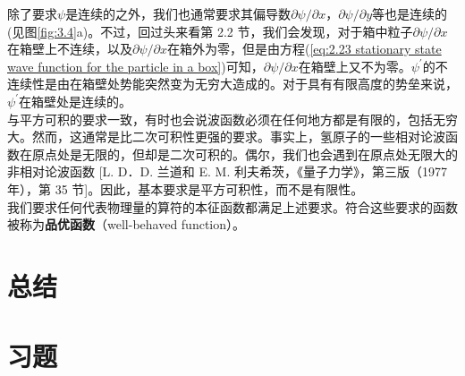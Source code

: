 	\indent 除了要求$\psi$是连续的之外，我们也通常要求其偏导数$\partial\psi/\partial x$，$\partial\psi/\partial y$等也是连续的(见图\ref{fig:3.4}a)。不过，回过头来看第 2.2 节，我们会发现，对于箱中粒子$\partial\psi/\partial x$在箱壁上不连续，以及$\partial\psi/\partial x$在箱外为零，但是由方程(\ref{eq:2.23 stationary state wave function for the particle in a box})可知，$\partial\psi/\partial x$在箱壁上又不为零。$\psi^{\prime}$的不连续性是由在箱壁处势能突然变为无穷大造成的。对于具有有限高度的势垒来说，$\psi^{\prime}$在箱壁处是连续的。\\
	\indent 与平方可积的要求一致，有时也会说波函数必须在任何地方都是有限的，包括无穷大。然而，这通常是比二次可积性更强的要求。事实上，氢原子的一些相对论波函数在原点处是无限的，但却是二次可积的。偶尔，我们也会遇到在原点处无限大的非相对论波函数 [L. D．D. 兰道和 E. M. 利夫希茨，《量子力学》，第三版（1977 年），第 35 节]。因此，基本要求是平方可积性，而不是有限性。\\
	\indent 我们要求任何代表物理量的算符的本征函数都满足上述要求。符合这些要求的函数被称为\textbf{品优函数}（well-behaved function）。

\section*{总结}

\section*{习题}